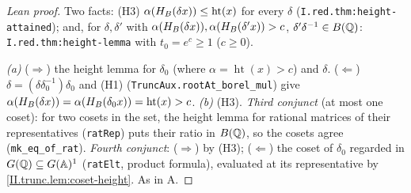 \begin{proof}[Lean proof]
Two facts: (H3) $\alpha(H_B(\delta x))\le\operatorname{ht}(x)$ for every $\delta$ (\texttt{I.red.thm:height-attained}); and, for $\delta,\delta'$ with $\alpha(H_B(\delta x)),\alpha(H_B(\delta'x))>c$, $\delta'\delta^{-1}\in B(\mathbb{Q})$: \texttt{I.red.thm:height-lemma} with $t_0=e^c\ge1$ ($c\ge0$).

\emph{(a)} ($\Rightarrow$) the height lemma for $\delta_0$ (where $\alpha=\operatorname{ht}(x)>c$) and $\delta$. ($\Leftarrow$) $\delta=(\delta\delta_0^{-1})\delta_0$ and (H1) (\texttt{TruncAux.rootAt\_borel\_mul}) give $\alpha(H_B(\delta x))=\alpha(H_B(\delta_0x))=\operatorname{ht}(x)>c$. \emph{(b)} (H3). \emph{Third conjunct} (at most one coset): for two cosets in the set, the height lemma for rational matrices of their representatives (\texttt{ratRep}) puts their ratio in $B(\mathbb{Q})$, so the cosets agree (\texttt{mk\_eq\_of\_rat}). \emph{Fourth conjunct}: ($\Rightarrow$) by (H3); ($\Leftarrow$) the coset of $\delta_0$ regarded in $G(\mathbb{Q})\subseteq G(\mathbb{A})^1$ (\texttt{ratElt}, product formula), evaluated at its representative by \cref{II.trunc.lem:coset-height}. As in A.
\end{proof}

